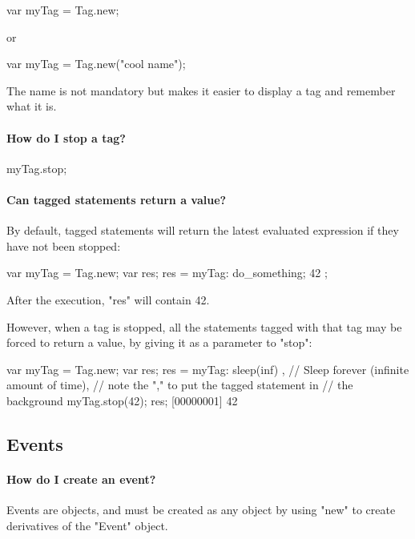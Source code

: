 \begin{urbifixme}
var myTag = Tag.new;
\end{urbifixme}

or

\begin{urbifixme}
var myTag = Tag.new("cool name");
\end{urbifixme}

The name is not mandatory but makes it easier to display a tag and remember
what it is.

\paragraph{How do I stop a tag?}
\begin{urbifixme}
myTag.stop;
\end{urbifixme}

\paragraph{Can tagged statements return a value?}
By default, tagged statements will return the latest evaluated expression if
they have not been stopped:

\begin{urbifixme}
var myTag = Tag.new;
var res;
res = { myTag: { do_something; 42 } };
\end{urbifixme}

After the execution, "res" will contain 42.

However, when a tag is stopped, all the statements tagged with that tag may
be forced to return a value, by giving it as a parameter to "stop":

\begin{urbifixme}
var myTag = Tag.new;
var res;
{ res = { myTag: sleep(inf) } }, // Sleep forever (infinite amount of time),
                                 // note the "," to put the tagged statement in
                                 // the background
myTag.stop(42);
res;
[00000001] 42
\end{urbifixme}

\subsection{Events}
\paragraph{How do I create an event?}
Events are objects, and must be created as any object by using "new" to create
derivatives of the "Event" object.

